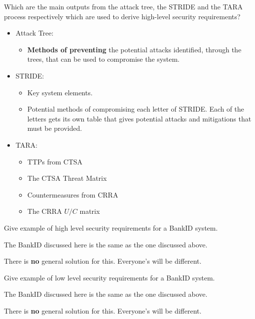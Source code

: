 \begin{questions}
\question{} Which are the main outputs from the attack tree, the STRIDE and the TARA process respectively which are used to derive high-level security requirements?
  \begin{solution}
    \begin{itemize}[noitemsep]
    \item Attack Tree:
      \begin{itemize}[noitemsep]
      \item \textbf{Methods of preventing} the potential attacks identified, through the trees, that can be used to compromise the system.
      \end{itemize}
    \item STRIDE:\@
      \begin{itemize}[noitemsep]
      \item Key system elements.
      \item Potential methods of compromising each letter of STRIDE.\@
        Each of the letters gets its own table that gives potential attacks and mitigations that must be provided.
      \end{itemize}
    \item TARA:\@
      \begin{itemize}[noitemsep]
      \item TTPs from CTSA
      \item The CTSA Threat Matrix
      \item Countermeasures from CRRA
      \item The CRRA $U/C$ matrix
      \end{itemize}
    \end{itemize}
  \end{solution}

\question{} Give example of high level security requirements for a BankID system.
  \begin{solution}
    The BankID discussed here is the same as the one discussed above.

    There is \textbf{no} general solution for this.
    Everyone's will be different.
  \end{solution}

\question{} Give example of low level security requirements  for a BankID system.
  \begin{solution}
    The BankID discussed here is the same as the one discussed above.

    There is \textbf{no} general solution for this.
    Everyone's will be different.
  \end{solution}


\end{questions}
